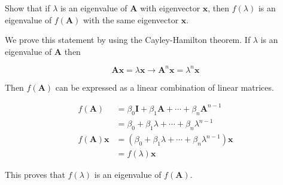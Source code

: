 \item[3.19] Show that if $\lambda$ is an eigenvalue of
$\mathbf{A}$ with eigenvector $\mathbf{x}$,
then $f(\lambda)$ is an eigenvalue of
$f(\mathbf{A})$ with the same eigenvector $\mathbf{x}$.

We prove this statement by using the Cayley-Hamilton theorem.
If $\lambda$ is an eigenvalue of $\mathbf{A}$ then

\begin{equation*}
 \mathbf{A} \mathbf{x} = \lambda \mathbf{x} \rightarrow
 \mathbf{A}^n \mathbf{x} = \lambda^n \mathbf{x}
\end{equation*}

Then $f(\mathbf{A})$ can be expressed as a linear combination of
linear matrices.

\begin{align*}
 f(\mathbf{A}) &= \beta_0 \mathbf{I} + \beta_1 \mathbf{A} + \cdots + \beta_n \mathbf{A}^{n-1}\\
 &= \beta_0 + \beta_1 \lambda + \cdots + \beta_n \lambda^{n-1}\\
 f(\mathbf{A}) \mathbf{x} &= (\beta_0 + \beta_1 \lambda + \cdots + \beta_n \lambda^{n-1}) \mathbf{x}\\
 &= f(\lambda) \mathbf{x}
\end{align*}

This proves that $f(\lambda)$ is an eigenvalue of $f(\mathbf{A})$.
